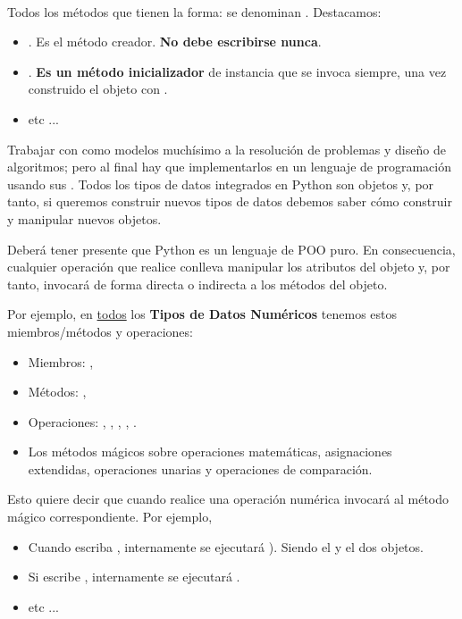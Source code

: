 \

Todos los métodos que tienen la forma:  se denominan    . Destacamos:

\begin{itemize}

\item {}. Es el método creador.  \textbf{No debe escribirse nunca}.

\item {}.   \textbf{Es un método inicializador} de instancia que se invoca siempre, una vez construido el objeto con .

\item etc ...
\end{itemize}


Trabajar con  como modelos  muchísimo  a la resolución de problemas y  diseño de algoritmos; pero al final hay que implementarlos en un lenguaje de programación usando sus .  Todos los tipos de datos integrados en Python son objetos y, por tanto, si queremos construir nuevos tipos de datos debemos saber cómo construir y manipular nuevos objetos.

Deberá tener presente que Python es un lenguaje de POO puro. En consecuencia, cualquier operación que realice conlleva manipular los atributos del objeto y, por tanto, invocará de forma directa o indirecta a los métodos del objeto.

Por ejemplo, en \underline{todos} los \textbf{Tipos de Datos Numéricos} tenemos estos miembros/métodos y operaciones:
	\begin{itemize}
	\item Miembros: , 
	\item Métodos: , 
	\item Operaciones: \cm{+}, \cm{-}, \cm{*}, \cm{/}, \cm{//}.
	\item Los métodos mágicos sobre operaciones matemáticas, asignaciones extendidas, operaciones unarias y operaciones de comparación.
	\end{itemize}

Esto quiere decir que cuando realice una operación numérica  invocará al método mágico correspondiente. Por ejemplo,  
	\begin{itemize}
	\item Cuando escriba , internamente se ejecutará ). Siendo el  y el  dos objetos.
	\item Si escribe , internamente se ejecutará .
	\item etc ...
	\end{itemize}

